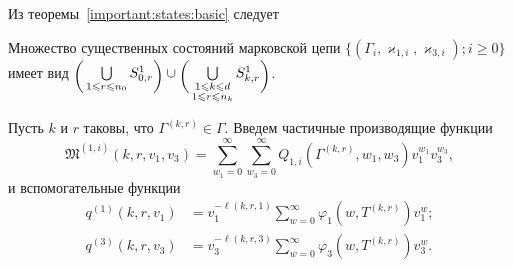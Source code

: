 Из теоремы~\ref{important:states:basic} следует 
\begin{theorem}
Множество существенных состояний марковской цепи $\{(\Gamma_i,  \varkappa_{1, i}, \varkappa_{3, i}); i \geqslant 0\}$ имеет вид $\raisebox{-.5ex}{$\biggl($}\bigcup\limits_{1 \leqslant r \leqslant n_0}S^1_{0, r}\raisebox{-.5ex}{$\biggr)$}\cup \raisebox{-.5ex}{$\biggl($}\bigcup\limits_{\substack{1 \leqslant k \leqslant d\\ 1 \leqslant r \leqslant n_k}} S^1_{k, r}\raisebox{-.5ex}{$\biggr)$}$.
\end{theorem}
Пусть $k$ и $r$ таковы,  что $\Gamma^{(k, r)}\in \Gamma$. Введем частичные производящие функции
\begin{equation*}
\mathfrak{M}^{(1, i)}(k, r, v_1, v_3) = \sum_{w_1=0}^{\infty}\sum_{w_3=0}^{\infty} Q_{1, i}(\Gamma^{(k, r)}, w_1, w_3) v_1^{w_1} v_3^{w_3},
\end{equation*}
и вспомогательные функции
\begin{align*}
q^{(1)}(k,r, v_1) &= v_1^{-\ell(k,r,1)}\sum_{w=0}^{\infty} \varphi_1(w,T^{(k,r)})v_1^w;\\
q^{(3)}(k,r, v_3) &= v_3^{-\ell(k,r,3)}\sum_{w=0}^{\infty} \varphi_3(w,T^{(k,r)})v_3^w.
\end{align*}

